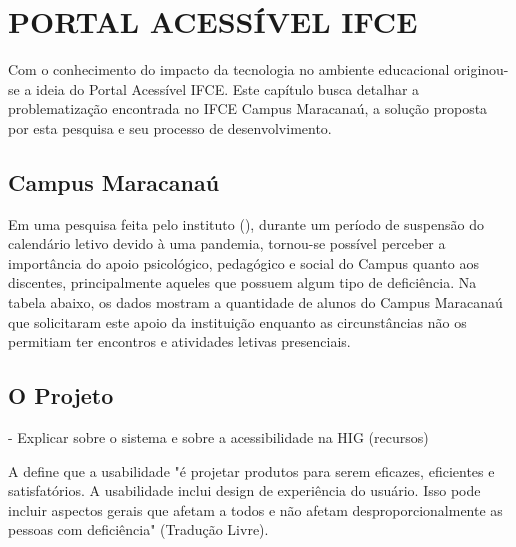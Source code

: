 
\chapter{PORTAL ACESSÍVEL IFCE}
\label{chap:portalIFCE}
Com o conhecimento do impacto da tecnologia no ambiente educacional originou-se a ideia do Portal Acessível IFCE. Este capítulo busca detalhar a problematização encontrada no IFCE Campus Maracanaú, a solução proposta por esta pesquisa e seu processo de desenvolvimento.

\section{Campus Maracanaú}
\label{sec:campus}


Em uma pesquisa feita pelo instituto (), durante um período de suspensão do calendário letivo devido à uma pandemia, tornou-se possível perceber a importância do apoio psicológico, pedagógico e social do Campus quanto aos discentes, principalmente aqueles que possuem algum tipo de deficiência. Na tabela abaixo, os dados mostram a quantidade de alunos do Campus Maracanaú que solicitaram este apoio da instituição enquanto as circunstâncias não os permitiam ter encontros e atividades letivas presenciais.



 
\section{O Projeto}
\label{sec:projeto}

- Explicar sobre o sistema e sobre a acessibilidade na HIG (recursos)

A  define que a usabilidade "é projetar produtos para serem eficazes, eficientes e satisfatórios. A usabilidade inclui design de experiência do usuário. Isso pode incluir aspectos gerais que afetam a todos e não afetam desproporcionalmente as pessoas com deficiência" (Tradução Livre).


